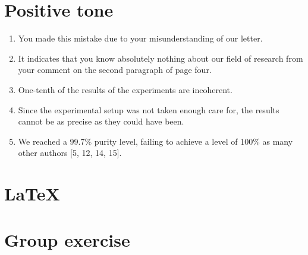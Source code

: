 \documentclass[paper=a4, fontsize=11pt]{scrartcl} %
\numberwithin{equation}{section} %
\numberwithin{figure}{section} %
\numberwithin{table}{section} %
\begin{document}
\section{Positive tone}
	\begin{enumerate}
		\item 
			You made this mistake due to your misunderstanding of our letter.
		\item 
			It indicates that you know absolutely nothing about our ﬁeld of research from your comment on the second paragraph of page four.
		\item
			 One-tenth of the results of the experiments are incoherent.
		\item
			 Since the experimental setup was not taken enough care for, the results cannot be as precise as they could have been.
		\item
			 We reached a 99.7\% purity level, failing to achieve a level of 100\% as many other authors [5, 12, 14, 15].
	\end{enumerate}

\section{\LaTeX}

\section{Group exercise}
\end{document}
